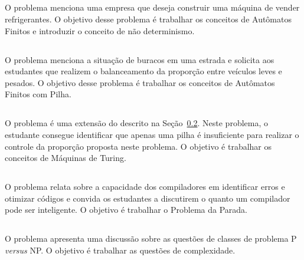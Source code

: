 \subsection{\ProblemaB}
O problema menciona uma empresa que deseja construir uma máquina
de vender refrigerantes.
O objetivo desse problema é trabalhar os conceitos de Autômatos
Finitos e introduzir o conceito de não determinismo.

\subsection{\ProblemaC}
\label{problema3}
O problema menciona a situação de buracos em uma estrada e
solicita aos estudantes que realizem o balanceamento da proporção
entre veículos leves e pesados.
O objetivo desse problema é trabalhar os conceitos de Autômatos
Finitos com Pilha.

\subsection{\ProblemaD}
O problema é uma extensão do descrito na Seção~\ref{problema3}.
Neste problema, o estudante consegue identificar que apenas uma pilha
é insuficiente para realizar o controle da proporção proposta neste
problema.
O objetivo é trabalhar os conceitos de Máquinas de Turing.

\subsection{\ProblemaE}
O problema relata sobre a capacidade dos compiladores
em identificar erros e otimizar códigos e convida os
estudantes a discutirem o quanto um compilador
pode ser inteligente.
O objetivo é trabalhar o Problema da Parada.

\subsection{\ProblemaF}
O problema apresenta uma discussão sobre as questões
de classes de problema P \textit{versus} NP.
O objetivo é trabalhar as questões de complexidade.

\subsection{\ProblemaG}

\subsection{\ProblemaH}

